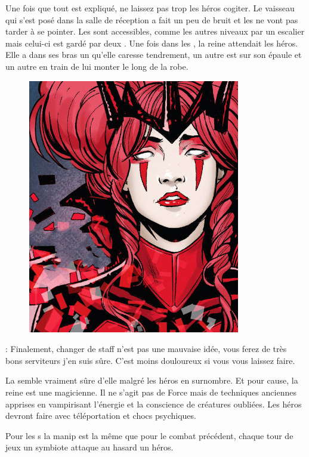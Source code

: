 Une fois que tout est expliqué, ne laissez pas trop les héros cogiter. Le vaisseau qui s’est posé dans la salle de réception a fait un peu de bruit et les  ne vont pas tarder à se pointer.
\bigbreak
Les  sont accessibles, comme les autres niveaux par un escalier mais celui-ci est gardé par deux . Une fois dans les , la reine attendait les héros. Elle a dans ses bras un  qu’elle caresse tendrement, un autre est sur son épaule et un autre en train de lui monter le long de la robe.

\begin{figure}[h]
\noindent\includegraphics[width=\linewidth]{_img/pnjs/ktath-atn-queen-fight.jpg}
\end{figure}
\begin{quotebox}
\noindent\textbf{}: Finalement, changer de staff n’est pas une mauvaise idée, vous ferez de très bons serviteurs j’en suis sûre. C’est moins douloureux si vous vous laissez faire.
\end{quotebox}

La  semble vraiment sûre d’elle malgré les héros en surnombre. Et pour cause, la reine est une magicienne. Il ne s’agit pas de Force mais de techniques anciennes apprises en vampirisant l’énergie et la conscience de créatures oubliées. Les héros devront faire avec téléportation et chocs psychiques.

Pour les s la manip est la même que pour le combat précédent, chaque tour de jeux un symbiote attaque au hasard un héros.